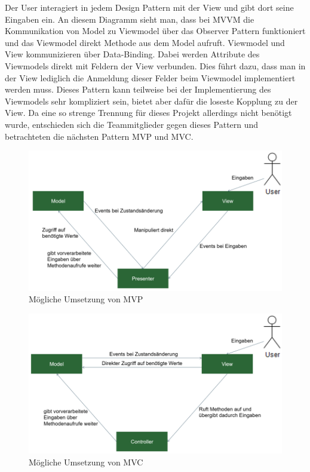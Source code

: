 
Der User interagiert in jedem Design Pattern mit der View und gibt dort seine Eingaben ein. An diesem Diagramm sieht man, dass bei MVVM die Kommunikation von Model zu Viewmodel über das Observer Pattern funktioniert und das Viewmodel direkt Methode aus dem Model aufruft. Viewmodel und View kommunizieren über Data-Binding. Dabei werden Attribute des Viewmodels direkt mit Feldern der View verbunden. Dies führt dazu, dass man in der View lediglich die Anmeldung dieser Felder beim Viewmodel implementiert werden muss. Dieses Pattern kann teilweise bei der Implementierung des Viewmodels sehr kompliziert sein, bietet aber dafür die loseste Kopplung zu der View. Da eine so strenge Trennung für dieses Projekt allerdings nicht benötigt wurde, entschieden sich die Teammitglieder gegen dieses Pattern und betrachteten die nächsten Pattern MVP und MVC. 


\begin{figure}[!h]
	\includegraphics[width=1\columnwidth]{img/design-pattern-moeglich-mvp}
	\caption[Mögliche Umsetzung von MVP]{Mögliche Umsetzung von MVP\footnotemark}
\end{figure}

\begin{figure}[!h]
	\includegraphics[width=1\columnwidth]{img/design-pattern-moeglich-mvc}
	\caption[Mögliche Umsetzung von MVC]{Mögliche Umsetzung von MVC\footnotemark}
\end{figure}

